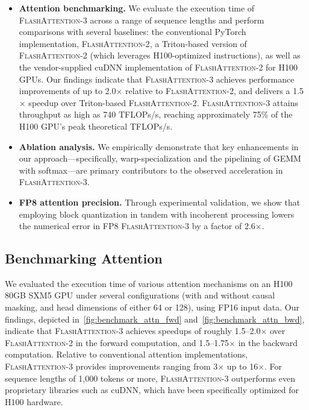 \begin{algorithm}[H]
\begin{algorithmic}[1]
\begin{itemize}
\item \textbf{Attention benchmarking.} We evaluate the execution time of \textsc{FlashAttention-3} across a range of sequence lengths and perform comparisons with several baselines: the conventional PyTorch implementation, \textsc{FlashAttention-2}, a Triton-based version of \textsc{FlashAttention-2} (which leverages H100-optimized instructions), as well as the vendor-supplied cuDNN implementation of \textsc{FlashAttention-2} for H100 GPUs. Our findings indicate that \textsc{FlashAttention-3} achieves performance improvements of up to 2.0$\times$ relative to \textsc{FlashAttention-2}, and delivers a 1.5$\times$ speedup over Triton-based \textsc{FlashAttention-2}. \textsc{FlashAttention-3} attains throughput as high as 740 TFLOPs/s, reaching approximately 75\% of the H100 GPU’s peak theoretical TFLOPs/s.
\item \textbf{Ablation analysis.} We empirically demonstrate that key enhancements in our approach—specifically, warp-specialization and the pipelining of GEMM with softmax—are primary contributors to the observed acceleration in \textsc{FlashAttention-3}.
\item \textbf{FP8 attention precision.} Through experimental validation, we show that employing block quantization in tandem with incoherent processing lowers the numerical error in FP8 \textsc{FlashAttention-3} by a factor of 2.6$\times$.
\end{itemize}

\subsection{Benchmarking Attention}
\label{subsec:benchmark_attn}

We evaluated the execution time of various attention mechanisms on an H100 80GB SXM5 GPU under several configurations (with and without causal masking, and head dimensions of either 64 or 128), using FP16 input data. Our findings, depicted in~\cref{fig:benchmark_attn_fwd} and~\cref{fig:benchmark_attn_bwd}, indicate that \textsc{FlashAttention-3} achieves speedups of roughly 1.5–2.0$\times$ over \textsc{FlashAttention-2} in the forward computation, and 1.5–1.75$\times$ in the backward computation. Relative to conventional attention implementations, \textsc{FlashAttention-3} provides improvements ranging from 3$\times$ up to 16$\times$. For sequence lengths of 1,000 tokens or more, \textsc{FlashAttention-3} outperforms even proprietary libraries such as cuDNN, which have been specifically optimized for H100 hardware.


\end{algorithmic}
\end{algorithm}
